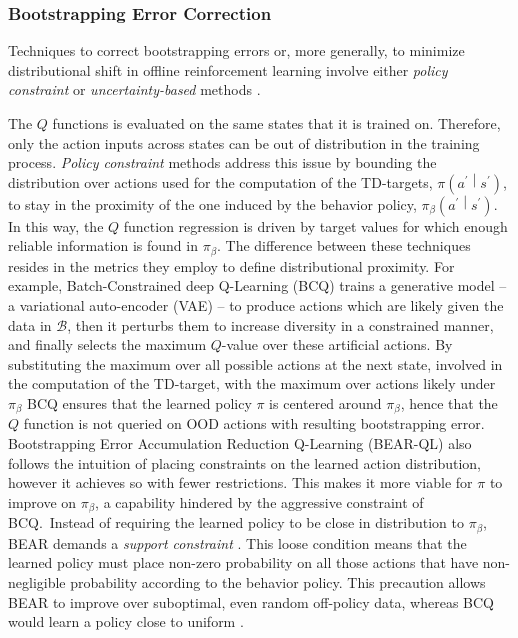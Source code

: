 \subsubsection{Bootstrapping Error
Correction}\label{sec:intro_related_work}
Techniques to correct bootstrapping errors or, more generally, to
minimize distributional shift in offline reinforcement learning
involve either \textit{policy constraint} or
\textit{uncertainty-based} methods \citep{levine2020offline}.

The $Q$ functions is evaluated on the same states that it is
trained on. Therefore, only the action inputs across states can be out
of distribution in the training process. \textit{Policy constraint}
methods address this issue by bounding the distribution over actions
used for the computation of the TD-targets,
$\pi\left(a^\prime\middle|s^\prime\right)$, to stay in the proximity
of the one induced by the behavior policy,
$\pi_\beta\left(a^\prime\middle|s^\prime\right)$. In this way, the $Q$
function regression is driven by target values for which enough
reliable information is found in $\pi_\beta$.
The difference
between these techniques resides in the metrics they employ to define
distributional proximity.
For example, Batch-Constrained deep Q-Learning (BCQ)
\citep{pmlr-v97-fujimoto19a} trains a generative model -- a variational
auto-encoder (VAE) \citep{kingma2013auto} -- to produce actions which
are likely given the data in $\mathcal{B}$, then it perturbs them to
increase diversity in a constrained manner, and finally selects the
maximum $Q$-value over these artificial actions. By substituting the
maximum over all possible actions at the next state, involved in the
computation of the TD-target, with the maximum over actions likely
under $\pi_\beta$ BCQ ensures that the learned policy $\pi$ is
centered around $\pi_\beta$, hence that the $Q$ function is not
queried on OOD actions with resulting bootstrapping
error. Bootstrapping Error Accumulation Reduction Q-Learning (BEAR-QL)
\citep{kumar2019stabilizing} also follows the intuition of placing
constraints on the learned action distribution, however it achieves so
with fewer restrictions. This makes it more viable for $\pi$ to
improve on $\pi_\beta$, a capability hindered by the aggressive
constraint of BCQ.\ Instead of requiring the learned policy to be
close in distribution to $\pi_\beta$, BEAR demands a \textit{support
constraint} \citep{kumar}. This loose condition means that the
learned policy must place non-zero probability on all those actions
that have non-negligible probability according to the behavior policy.
This precaution allows BEAR to improve over suboptimal, even random
off-policy data, whereas BCQ would learn a policy close to uniform
\citep{kumar2019stabilizing}.

